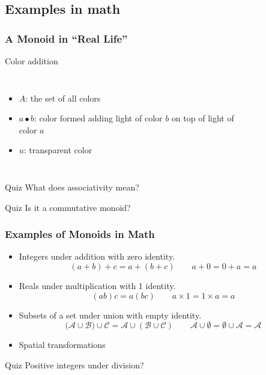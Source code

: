 \documentclass{beamer}
\begin{document}
\subsection{Examples in math}
\begin{frame}\frametitle{A Monoid in ``Real Life''}
  Color addition

  \begin{columns}[c]
      \begin{itemize}
        \item \(A\): the set of all colors
        \item \(a \bullet b\): color formed adding light of color \(b\) on top
          of light of color \(a\)
        \item \(u\): transparent color
      \end{itemize}


    \begin{figure}
        \centering
        \def\svgwidth{\columnwidth}
        
    \end{figure}
  \end{columns}

  \begin{block}{Quiz}
  What does associativity mean?
  \end{block}

  \begin{block}{Quiz}
  Is it a commutative monoid?
  \end{block}

\end{frame}

\begin{frame}\frametitle{Examples of Monoids in Math}
  \begin{itemize}
    \item Integers under addition with zero identity.
      \[
      (a + b) + c = a + (b + c) \qquad a + 0 = 0 + a = a
      \]
    \item Reals under multiplication with 1 identity.
      \[
        (a b) c = a (b c) \qquad a \times 1 = 1 \times a = a\]
    \item Subsets of a set under union with empty identity.
      \[
        \mathcal
        (\mathcal{A} \cup \mathcal{B})\cup  \mathcal{C} = \mathcal{A}\cup  (\mathcal{B}\cup  \mathcal{C}) \qquad
        \mathcal{A} \cup \emptyset = \emptyset \cup \mathcal{A} = \mathcal{A}
      \]
    \item Spatial transformations
  \end{itemize}
  \begin{block}{Quiz}
    Positive integers under division?
  \end{block}
\end{frame}
\end{document}
